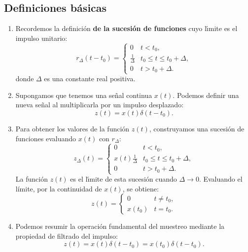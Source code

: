 \documentclass[11pt,a4paper,openany]{book}
\begin{document}
\subsection{Definiciones b\'{a}sicas}

\begin{enumerate}
	\item Recordemos la definici\'{o}n \textbf{de la sucesi\'{o}n de funciones} cuyo l\'{\i}mite es el impulso unitario:
	\begin{equation}
		r_{\Delta} (t - t_{0}) = 
		\begin{cases}
			0 & t < t_{0}, \\
			\frac{1}{\Delta} & t_{0} \leq t \leq t_{0} + \Delta, \\
			0 & t > t_{0} + \Delta.
		\end{cases}
	\end{equation}
	donde $\Delta$ es una constante real positiva.
	
	\item Supongamos que tenemos una se\~{n}al continua $x(t)$. Podemos definir una nueva se\~{n}al al multiplicarla por un impulso desplazado:
	\begin{equation}
		z(t) = x(t) \delta(t - t_{0}).
	\end{equation}
	
	\item Para obtener los valores de la funci\'{o}n $z(t)$, construyamos una sucesi\'{o}n de funciones evaluando $x(t)$ con $r_{\Delta}$:
	\begin{equation}
		z_{\Delta}(t) = 
		\begin{cases}
			0 & t < t_{0}, \\
			x(t) \frac{1}{\Delta} & t_{0} \leq t \leq t_{0} + \Delta, \\
			0 & t > t_{0} + \Delta.
		\end{cases}
	\end{equation}
	La funci\'{o}n $z(t)$ es el l\'{\i}mite de esta sucesi\'{o}n cuando $\Delta \rightarrow 0$. Evaluando el límite, por la continuidad de $x(t)$, se obtiene:
	\begin{equation}
		z(t) = 
		\begin{cases}
			0 & t \neq t_{0}, \\
			x(t_{0}) & t = t_{0}.
		\end{cases}             
		\label{muescont}
	\end{equation}
	
	\item Podemos resumir la operaci\'{o}n fundamental del muestreo mediante la propiedad de filtrado del impulso:              
	\begin{equation}
		z(t) = x(t) \delta(t-t_{0}) = x(t_{0}) \delta(t-t_{0}).
	\end{equation}
\end{enumerate}
\end{document}

